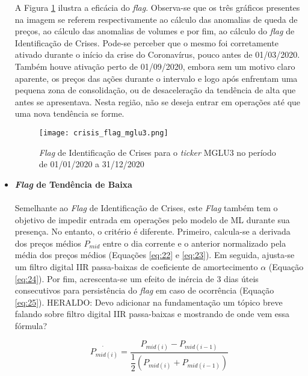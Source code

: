 \begin{itemize}
        A Figura \ref{fig:104} ilustra a eficácia do \textit{flag}. Observa-se que os três gráficos presentes na imagem se referem respectivamente ao cálculo das anomalias de queda de preços, ao cálculo das anomalias de volumes e por fim, ao cálculo do \textit{flag} de Identificação de Crises. Pode-se perceber que o mesmo foi corretamente ativado durante o início da crise do Coronavírus, pouco antes de 01/03/2020. Também houve ativação perto de 01/09/2020, embora sem um motivo claro aparente, os preços das ações durante o intervalo e logo após enfrentam uma pequena zona de consolidação, ou de desaceleração da tendência de alta que antes se apresentava. Nesta região, não se deseja entrar em operações até que uma nova tendência se forme.

        \begin{figure}[h]
            \texttt{[image: crisis\_flag\_mglu3.png]}
            \centering
            \caption{\textit{Flag} de Identificação de Crises para o \textit{ticker} MGLU3 no período de 01/01/2020 a 31/12/2020}
            \label{fig:104}
        \end{figure}


    \item \textbf{\textit{Flag} de Tendência de Baixa} \\ \\
    Semelhante ao \textit{Flag} de Identificação de Crises, este \textit{Flag} também tem o objetivo de impedir entrada em operações pelo modelo de ML durante sua presença. No entanto, o critério é diferente. Primeiro, calcula-se a derivada dos preços médios \begin{math} \dot{P_{mid}} \end{math} entre o dia corrente e o anterior normalizado pela média dos preços médios (Equações \ref{eq:22} e \ref{eq:23}). Em seguida, ajusta-se um filtro digital IIR passa-baixas de coeficiente de amortecimento \begin{math} \alpha \end{math} (Equação \ref{eq:24}). Por fim, acrescenta-se um efeito de inércia de 3 dias úteis consecutivos para persistência do \textit{flag} em caso de ocorrência (Equação \ref{eq:25}). \color{red} HERALDO: Devo adicionar na fundamentação um tópico breve falando sobre filtro digital IIR passa-baixas e mostrando de onde vem essa fórmula? 

    \begin{equation} \label{eq:23}
        \dot{P_{mid(i)}} = \dfrac{ P_{mid(i)} - P_{mid(i-1)} }{ \dfrac{1}{2}(P_{mid(i)} + P_{mid(i-1)}) }
    \end{equation}


\end{itemize}
